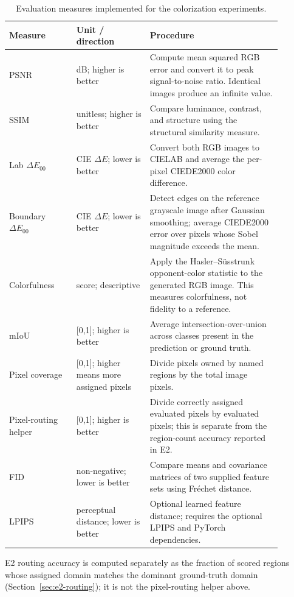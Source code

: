 \documentclass{FastFyp}
\begin{document}
\begin{table}[htbp]
\centering
\caption{Evaluation measures implemented for the colorization experiments.}
\label{tab:person-c-metrics}
\begin{tabular}{p{0.22\linewidth}p{0.24\linewidth}p{0.43\linewidth}}
\hline
Measure & Unit / direction & Procedure\\
\hline
PSNR & dB; higher is better & Compute mean squared RGB error and convert it to peak signal-to-noise ratio. Identical images produce an infinite value.\\
SSIM & unitless; higher is better & Compare luminance, contrast, and structure using the structural similarity measure.\\
Lab $\Delta E_{00}$ & CIE $\Delta E$; lower is better & Convert both RGB images to CIELAB and average the per-pixel CIEDE2000 color difference.\\
Boundary $\Delta E_{00}$ & CIE $\Delta E$; lower is better & Detect edges on the reference grayscale image after Gaussian smoothing; average CIEDE2000 error over pixels whose Sobel magnitude exceeds the mean.\\
Colorfulness & score; descriptive & Apply the Hasler--S\"usstrunk opponent-color statistic to the generated RGB image. This measures colorfulness, not fidelity to a reference.\\
mIoU & [0,1]; higher is better & Average intersection-over-union across classes present in the prediction or ground truth.\\
Pixel coverage & [0,1]; higher means more assigned pixels & Divide pixels owned by named regions by the total image pixels.\\
Pixel-routing helper & [0,1]; higher is better & Divide correctly assigned evaluated pixels by evaluated pixels; this is separate from the region-count accuracy reported in E2.\\
FID & non-negative; lower is better & Compare means and covariance matrices of two supplied feature sets using Fr\'echet distance.\\
LPIPS & perceptual distance; lower is better & Optional learned feature distance; requires the optional LPIPS and PyTorch dependencies.\\
\hline
\end{tabular}
\end{table}

E2 routing accuracy is computed separately as the fraction of scored regions whose assigned domain matches the dominant ground-truth domain (Section~\ref{sec:e2-routing}); it is not the pixel-routing helper above.
\end{document}
